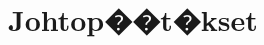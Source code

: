 \documentclass[12pt,a4paper,finnish,margin=2in]{article}
\begin{document}
\section{Johtop��t�kset}






\end{document}
